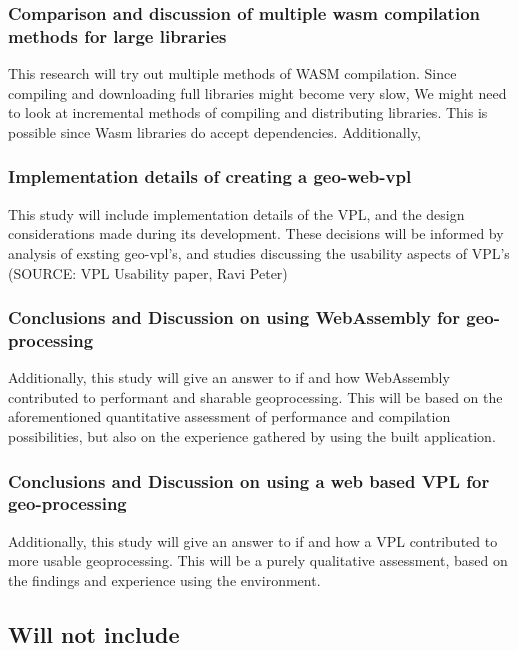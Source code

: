 \subsubsection*{Comparison and discussion of multiple wasm compilation methods for large libraries}
This research will try out multiple methods of WASM compilation. 
Since compiling and downloading full libraries might become very slow, We might need to look at incremental methods of compiling and distributing libraries. 
This is possible since Wasm libraries do accept dependencies. 
Additionally, 


\subsubsection*{Implementation details of creating a geo-web-vpl}

This study will include implementation details of the VPL, and the design considerations made during its development. These decisions will be informed by analysis of exsting geo-vpl's, and studies discussing the usability aspects of VPL's (SOURCE: VPL Usability paper,  Ravi Peter)


\subsubsection*{Conclusions and Discussion on using WebAssembly for geo-processing}

Additionally, this study will give an answer to if and how WebAssembly contributed to performant and sharable geoprocessing. 
This will be based on the aforementioned quantitative assessment of performance and compilation possibilities, but also on the experience gathered by using the built application.  

\subsubsection*{Conclusions and Discussion on using a web based VPL for geo-processing}

Additionally, this study will give an answer to if and how a VPL contributed to more usable geoprocessing. This will be a purely qualitative assessment, based on the findings and experience using the environment.  


\subsection*{Will not include}

